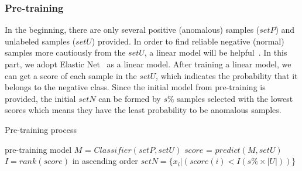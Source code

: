 \subsubsection{Pre-training}
\label{subsubsubsec:Pre-training}
In the beginning, there are only several positive (anomalous) samples ($setP$) and unlabeled samples ($setU$) provided. In order to find reliable negative (normal) samples more cautiously from the $setU$, a linear model will be helpful~\cite{PULearning_for_Anomaly_Detection}. In this part, we adopt Elastic Net~\cite{ElasticNet} as a linear model. After training a linear model, we can get a score of each sample in the $setU$, which indicates the probability that it belongs to the negative class.
Since the initial model from pre-training is provided, the initial $setN$ can be formed by $s\%$ samples selected with the lowest scores which means they have the least probability to be anomalous samples.
\begin{algorithm}
\caption{Pre-training process} 
pre-training model $M$ = $Classifier(setP, setU)$\;
$score$ = $predict(M, setU)$\;
$I=rank(score)$ in ascending order\;
$setN=\{x_i|(score(i)<I(s\% \times |U|))\}$\;
\end{algorithm}
\par
